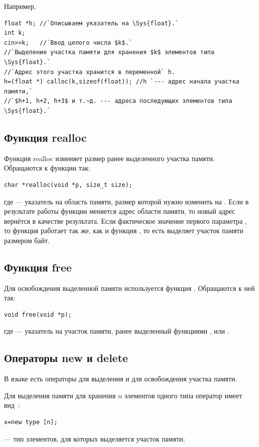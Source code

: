 Например,
\begin{lstlisting}
float *h; //`Описываем указатель на \Sys{float}.`
int k;
cin>>k;   //`Ввод целого числа $k$.`
//`Выделение участка памяти для хранения $k$ элементов типа \Sys{float}.` 
//`Адрес этого участка хранится в переменной` h.
h=(float *) calloc(k,sizeof(float)); //h `--- адрес начала участка памяти,` 
//`$h+1, h+2, h+3$ и т.~д. --- адреса последующих элементов типа \Sys{float}.`
\end{lstlisting}

\subsection[Функция realloc]{Функция realloc}
Функция realloc изменяет размер ранее выделенного участка памяти. Обращаются к функции так:
\begin{lstlisting}
char *realloc(void *p, size_t size);
\end{lstlisting}
где  --- указатель на область памяти, размер которой нужно изменить на . Если в
результате работы функции меняется адрес области памяти, то новый адрес вернётся в качестве результата. Если
фактическое значение первого параметра , то функция  работает так же,
как и функция , то есть выделяет участок памяти размером  байт.

\subsection[Функция free]{Функция free}
Для освобождения выделенной памяти используется функция . Обращаются к ней так:
\begin{lstlisting}
void free(void *p);
\end{lstlisting}
где  --- указатель на участок памяти, ранее выделенный функциями ,
 или .

\subsection[Операторы new и delete]{Операторы new и delete}
В языке  есть операторы  для выделения и
 для освобождения участка памяти.

Для выделения памяти для хранения $n$ элементов одного типа оператор  имеет вид~\cite{OOP}:%
\begin{lstlisting}
x=new type [n];
\end{lstlisting}
 --- тип элементов, для которых выделяется участок памяти;


